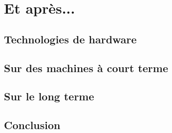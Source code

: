 \part{Et après...}
\chapter{Technologies de hardware}

\chapter{Sur des machines à court terme}

\chapter{Sur le long terme}

\chapter{Conclusion}